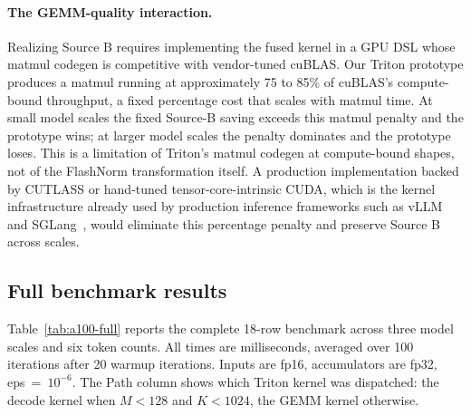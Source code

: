 \documentclass{article}
\begin{document}
\paragraph{The GEMM-quality interaction.} Realizing Source B requires implementing the fused kernel in a GPU DSL whose matmul codegen is competitive with vendor-tuned cuBLAS. Our Triton prototype produces a matmul running at approximately 75 to 85\% of cuBLAS's compute-bound throughput, a fixed percentage cost that scales with matmul time. At small model scales the fixed Source-B saving exceeds this matmul penalty and the prototype wins; at larger model scales the penalty dominates and the prototype loses. This is a limitation of Triton's matmul codegen at compute-bound shapes, not of the FlashNorm transformation itself. A production implementation backed by CUTLASS or hand-tuned tensor-core-intrinsic CUDA, which is the kernel infrastructure already used by production inference frameworks such as vLLM~\citep{vLLM} and SGLang~\citep{sglang}, would eliminate this percentage penalty and preserve Source B across scales.

\subsection{Full benchmark results}

Table~\ref{tab:a100-full} reports the complete 18-row benchmark across three model scales and six token counts. All times are milliseconds, averaged over 100 iterations after 20 warmup iterations. Inputs are fp16, accumulators are fp32, eps~=~$10^{-6}$. The Path column shows which Triton kernel was dispatched: the decode kernel when $M < 128$ and $K < 1024$, the GEMM kernel otherwise.
\end{document}
